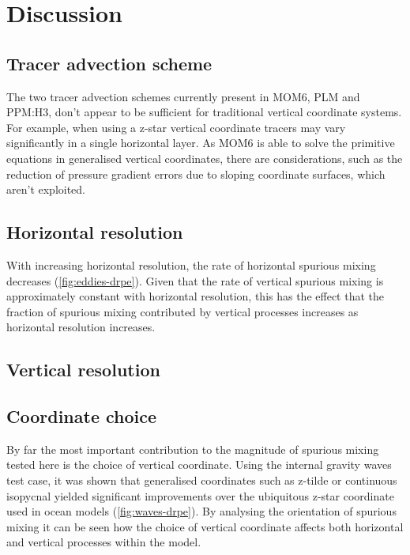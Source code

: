 \section{Discussion}
\subsection{Tracer advection scheme}
The two tracer advection schemes currently present in MOM6, PLM and PPM:H3, don't appear to be sufficient for traditional vertical coordinate systems. For example, when using a z-star vertical coordinate tracers may vary significantly in a single horizontal layer. As MOM6 is able to solve the primitive equations in generalised vertical coordinates, there are considerations, such as the reduction of pressure gradient errors due to sloping coordinate surfaces, which aren't exploited.

\subsection{Horizontal resolution}
With increasing horizontal resolution, the rate of horizontal spurious mixing decreases (\cref{fig:eddies-drpe}). Given that the rate of vertical spurious mixing is approximately constant with horizontal resolution, this has the effect that the fraction of spurious mixing contributed by vertical processes increases as horizontal resolution increases.

\subsection{Vertical resolution}

\subsection{Coordinate choice}
By far the most important contribution to the magnitude of spurious mixing tested here is the choice of vertical coordinate. Using the internal gravity waves test case, it was shown that generalised coordinates such as z-tilde or continuous isopycnal yielded significant improvements over the ubiquitous z-star coordinate used in ocean models (\cref{fig:waves-drpe}). By analysing the orientation of spurious mixing it can be seen how the choice of vertical coordinate affects both horizontal and vertical processes within the model.


